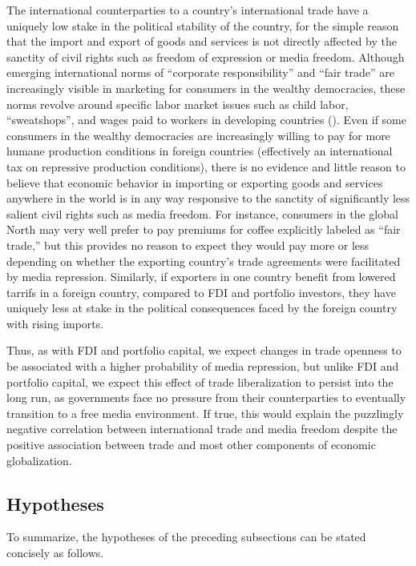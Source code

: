 \documentclass[12pt]{report}
\begin{document}
The international counterparties to a country's international trade
have a uniquely low stake in the political stability of the country,
for the simple reason that the import and export of goods and services
is not directly affected by the sanctity of civil rights such as freedom
of expression or media freedom. Although emerging international norms
of ``corporate responsibility'' and ``fair trade'' are increasingly
visible in marketing for consumers in the wealthy democracies, these
norms revolve around specific labor market issues such as child labor,
``sweatshops'', and wages paid to workers in developing countries
(\citealt{Moore:2004gy}). Even if some consumers in the wealthy democracies
are increasingly willing to pay for more humane production conditions
in foreign countries (effectively an international tax on repressive
production conditions), there is no evidence and little reason to
believe that economic behavior in importing or exporting goods and
services anywhere in the world is in any way responsive to the sanctity
of significantly less salient civil rights such as media freedom.
For instance, consumers in the global North may very well prefer to
pay premiums for coffee explicitly labeled as ``fair trade,'' but
this provides no reason to expect they would pay more or less depending
on whether the exporting country's trade agreements were facilitated
by media repression. Similarly, if exporters in one country benefit
from lowered tarrifs in a foreign country, compared to FDI and portfolio
investors, they have uniquely less at stake in the political consequences
faced by the foreign country with rising imports.

Thus, as with FDI and portfolio capital, we expect changes in trade
openness to be associated with a higher probability of media repression,
but unlike FDI and portfolio capital, we expect this effect of trade
liberalization to persist into the long run, as governments face no
pressure from their counterparties to eventually transition to a free
media environment. If true, this would explain the puzzlingly negative
correlation between international trade and media freedom despite
the positive association between trade and most other components of
economic globalization.

\subsection{Hypotheses}

To summarize, the hypotheses of the preceding subsections can be stated
concisely as follows.
\end{document}
